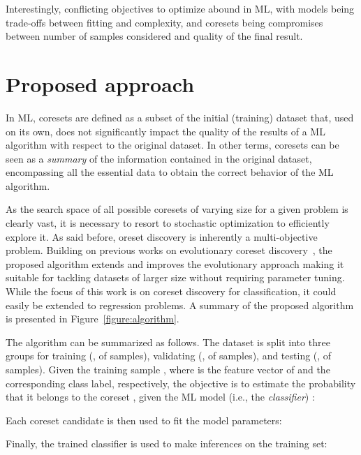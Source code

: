 \documentclass{article}
\begin{document}
Interestingly, conflicting objectives to optimize abound in ML, with models being trade-offs between fitting and complexity, and coresets being compromises between number of samples considered and quality of the final result.

\section{Proposed approach}
\label{sec:alberto:proposed_approach}


In ML, coresets are defined as a subset of the initial (training) dataset that, used on its own, does not significantly impact the quality of the results of a ML algorithm with respect to the original dataset. In other terms, coresets can be seen as a \textit{summary} of the information contained in the original dataset, encompassing all the essential data to obtain the correct behavior of the ML algorithm. 








As the search space of all possible coresets of varying size for a given problem is clearly vast, it is necessary to resort to stochastic optimization to efficiently explore it. As said before, oreset discovery is inherently a multi-objective problem. Building on previous works on evolutionary coreset discovery~\cite{barbiero2019fundamental,barbiero2019evolutionary}, the proposed algorithm extends and improves the evolutionary approach making it suitable for tackling datasets of larger size without requiring parameter tuning. While the focus of this work is on coreset discovery for classification, it could easily be extended to regression problems. A summary of the proposed algorithm is presented in Figure~\ref{figure:algorithm}.



The algorithm can be summarized as follows. The dataset  is split into three groups for training (,  of samples), validating (,  of samples), and testing (,  of samples). Given the training sample , where  is the feature vector of  and  the corresponding class label, respectively, the objective is to estimate the probability that it belongs to the coreset , given the ML model (i.e., the \textit{classifier}) :

Each coreset candidate  is then used to fit the model parameters:

Finally, the trained classifier is used to make inferences on the training set:
\end{document}
